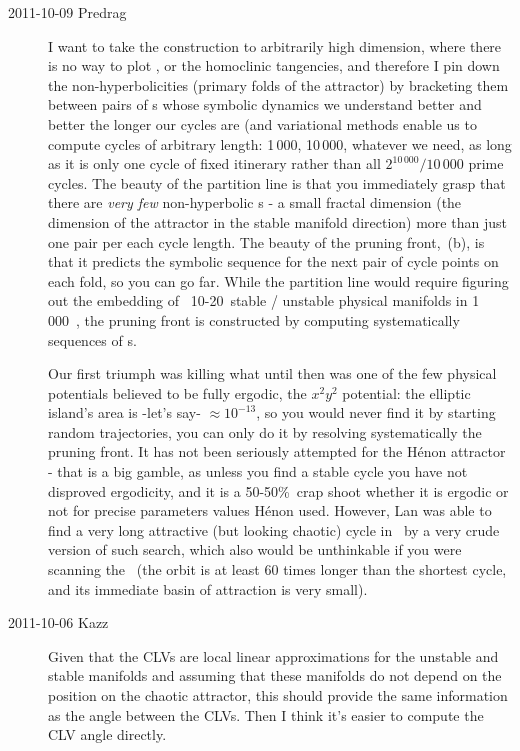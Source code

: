 \begin{description}
\item[2011-10-09 Predrag]
I want to take the construction to arbitrarily high dimension, where
there is no way to plot , or the
homoclinic tangencies, and therefore I pin down the non-hyperbolicities
(primary folds of the attractor) by bracketing them between pairs of \po
s whose symbolic dynamics we understand better and better the longer our
cycles are (and variational methods enable us to compute cycles of
arbitrary length: 1\,000, 10\,000, whatever we need, as long as it is
only one cycle of fixed itinerary rather than all $2^{10\,000}/10\,000$
prime cycles. The beauty of the partition line is that you immediately
grasp that there are \emph{very few} non-hyperbolic \po s - a small
fractal dimension (the dimension of the attractor in the stable manifold
direction) more than just one pair per each cycle length. The beauty of
the pruning front, \,(b), is that it predicts the
symbolic sequence for the next pair of cycle points on each fold, so you
can go far. While the partition line would require figuring out the
embedding of \KS\ 10-20\dmn\ stable / unstable physical manifolds in
1\,000\dmn\ \statesp, the pruning front is constructed by computing
systematically sequences of \po s.

Our first triumph was killing what until then was one of the
few physical potentials believed to be fully ergodic, the $x^{2}y^{2}$
potential: the elliptic island's area is -let's say- $\approx 10^{-13}$, so you
would never find it by starting random trajectories, you can only do it
by  resolving systematically the pruning front. It has not been seriously
attempted for the H\'enon attractor - that is a big gamble, as unless you
find a stable cycle you have not disproved ergodicity, and it is a
50-50\%\ crap shoot whether it is ergodic or not for precise
parameters values H\'enon used. However, Lan was able to find a
very long attractive (but looking chaotic) cycle in \KS\ by a very crude
version of such search, which also would be unthinkable if you were
scanning the \statesp\ (the orbit is at least 60 times longer than the
shortest cycle, and its immediate basin of attraction is very small).

\item[2011-10-06 Kazz]
Given that the CLVs are local linear approximations for the unstable and
stable manifolds and assuming that these manifolds do not depend on the
position on the chaotic attractor, this should provide the same
information as the angle between the CLVs. Then I think it's easier to
compute the CLV angle directly.


\end{description}
